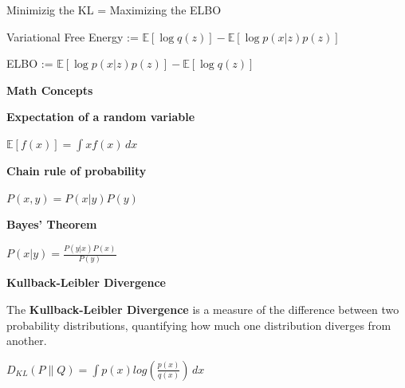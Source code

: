 \documentclass{amsart}
\begin{document}
Minimizig the KL = Maximizing the ELBO \vspace{0.2 cm}

Variational Free Energy := $\mathbb{E}[\log q(z)] - \mathbb{E}[\log p(x|z)p(z)]$ \vspace{0.2 cm}

ELBO := $\mathbb{E}[\log p(x|z)p(z)] - \mathbb{E}[\log q(z)]$ \vspace{0.2 cm}

\vspace{1 cm}

\clearpage



\textbf{Math Concepts} \vspace{0.2 cm}

\textbf{Expectation of a random variable} \vspace{0.2 cm}

$\mathbb{E}[f(x)] = \int xf(x)\,dx$ \vspace{0.2 cm}

\textbf{Chain rule of probability} \vspace{0.2 cm}

$P(x,y) = P(x|y)P(y)$ \vspace{0.2 cm}

\textbf{Bayes' Theorem} \vspace{0.2 cm}

$P(x|y) = \frac{P(y|x)P(x)}{P(y)}$ \vspace{0.2 cm}

\vspace{1 cm}

\textbf{Kullback-Leibler Divergence} \vspace{0.2 cm}

The \textbf{Kullback-Leibler Divergence} is a measure of the difference between two probability distributions, quantifying how much one distribution diverges from another. \vspace{0.2 cm}

$D_{KL}(P \parallel Q) = \int p(x)log\left( \frac{p(x)}{q(x)} \right)\,dx$ \vspace{0.2 cm}
\end{document}
